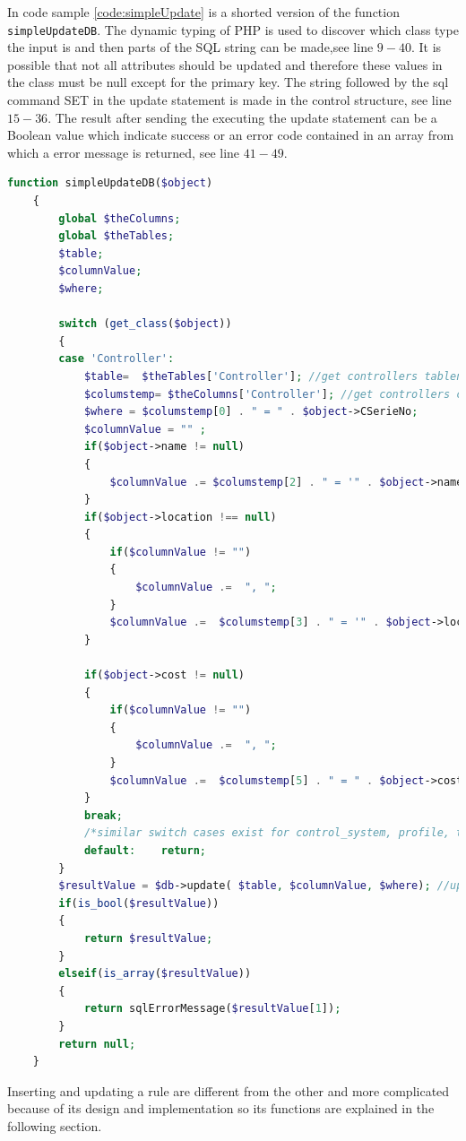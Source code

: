 In code sample \ref{code:simpleUpdate} is a shorted version of the function \texttt{simpleUpdateDB}.
The dynamic typing of PHP is used to discover which class type the input is and then parts of the SQL string can be made,see line $9-40$. 
It is possible that not all attributes should be updated and therefore these values in the class must be null except for the primary key.
The string followed by the sql command SET in the update statement is made in the control structure, see line $15-36$. 
The result after sending the executing the update statement can be a Boolean value which indicate success or an error code contained in an array from which a error message is returned, see line $41-49$.

\begin{lstlisting}[language=PHP, label=code:simpleUpdate, caption=simpleUpdateDB code sample]
function simpleUpdateDB($object)
	{
		global $theColumns;
		global $theTables;
		$table;
		$columnValue;
		$where;

		switch (get_class($object))
		{ 		
		case 'Controller':
			$table=  $theTables['Controller']; //get controllers tablename
			$columstemp= $theColumns['Controller']; //get controllers columns in array
			$where = $columstemp[0] . " = " . $object->CSerieNo;
			$columnValue = "" ;
			if($object->name != null)
			{
				$columnValue .= $columstemp[2] . " = '" . $object->name . "'";
			}
			if($object->location !== null) 
			{
				if($columnValue != "")
				{
					$columnValue .=  ", ";
				}
				$columnValue .=  $columstemp[3] . " = '" . $object->location . "'";
			}
			
			if($object->cost != null)
			{
				if($columnValue != "")
				{
					$columnValue .=  ", ";
				}
				$columnValue .=  $columstemp[5] . " = " . $object->cost;
			}
			break;
			/*similar switch cases exist for control_system, profile, tag, controller or chore*/
			default: 	return;
		}
		$resultValue = $db->update( $table, $columnValue, $where); //update the 
		if(is_bool($resultValue))
		{ 
			return $resultValue;
		}
		elseif(is_array($resultValue))
		{
			return sqlErrorMessage($resultValue[1]);
		}
		return null;
	}	
\end{lstlisting}

Inserting and updating a rule are different from the other and more complicated because of its design and implementation so its functions are explained in the following section. 

